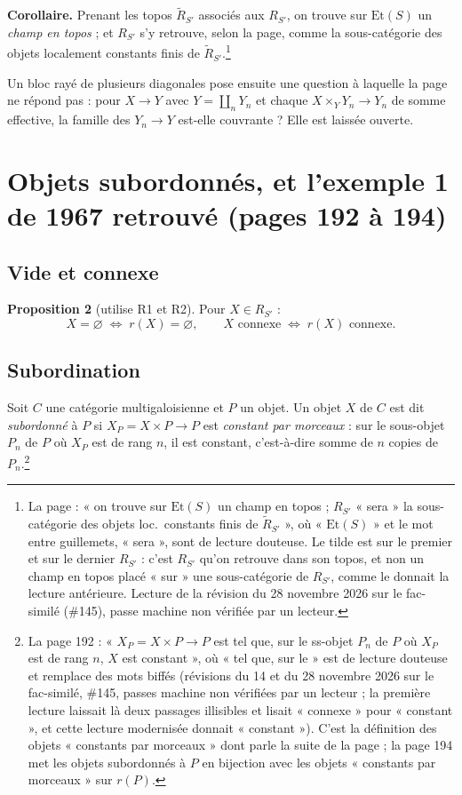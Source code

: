 \documentclass[11pt,a4paper]{article}
\begin{document}
\textbf{Corollaire.} Prenant les topos $\tilde{R}_{S'}$ associés aux
$R_{S'}$, on trouve sur $\mathrm{Et}(S)$ un \emph{champ en topos} ; et
$R_{S'}$ s'y retrouve, selon la page, comme la sous-catégorie des objets
localement constants finis de $\tilde{R}_{S'}$.\footnote{La page : « on
trouve sur $\mathrm{Et}(S)$ un champ en topos ; $R_{S'}$ « sera » la
sous-catégorie des objets loc.\ constants finis de $\tilde{R}_{S'}$ », où
« $\mathrm{Et}(S)$ » et le mot entre guillemets, « sera », sont de lecture
douteuse. Le tilde est sur le premier et sur le dernier $R_{S'}$ : c'est
$R_{S'}$ qu'on retrouve dans son topos, et non un champ en topos placé
« sur » une sous-catégorie de $R_{S'}$, comme le donnait la lecture
antérieure. Lecture de la révision du 28 novembre 2026 sur le fac-similé (\#145), passe machine non vérifiée par un lecteur.}

Un bloc rayé de plusieurs diagonales pose ensuite une question à laquelle la
page ne répond pas : pour $X \to Y$ avec $Y = \coprod_{n} Y_{n}$ et chaque
$X \times_{Y} Y_{n} \to Y_{n}$ de somme effective, la famille des
$Y_{n} \to Y$ est-elle couvrante ? Elle est laissée ouverte.

\section*{Objets subordonnés, et l'exemple 1 de 1967 retrouvé (pages 192 à 194)}

\subsection*{Vide et connexe}

\textbf{Proposition 2} (utilise R1 et R2). Pour $X \in R_{S'}$ :
\[
  X = \varnothing \;\Longleftrightarrow\; r(X) = \varnothing ,
  \qquad
  X \text{ connexe} \;\Longleftrightarrow\; r(X) \text{ connexe} .
\]

\subsection*{Subordination}

Soit $C$ une catégorie multigaloisienne et $P$ un objet. Un objet $X$ de $C$
est dit \emph{subordonné} à $P$ si $X_{P} = X \times P \to P$ est
\emph{constant par morceaux} : sur le sous-objet $P_{n}$ de $P$ où $X_{P}$
est de rang $n$, il est constant, c'est-à-dire somme de $n$ copies de
$P_{n}$.\footnote{La page 192 : « $X_{P} = X \times P \to P$ est tel que,
sur le ss-objet $P_{n}$ de $P$ où $X_{P}$ est de rang $n$, $X$ est
constant », où « tel que, sur le » est de lecture douteuse et remplace des
mots biffés (révisions du 14 et du 28 novembre 2026 sur le fac-similé,
\#145, passes machine non vérifiées par un lecteur ; la première lecture
laissait là deux passages illisibles et lisait « connexe » pour
« constant », et cette lecture modernisée donnait « constant »). C'est la
définition des objets « constants par morceaux » dont parle la suite de la
page ; la page 194 met les objets subordonnés à $P$ en bijection avec les
objets « constants par morceaux » sur $r(P)$.}
\end{document}
